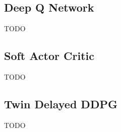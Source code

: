 \documentclass[../xlapes02]{subfiles}
\begin{document}
    \subsection{Deep Q Network}
    TODO

    \subsection{Soft Actor Critic}
    TODO

    \subsection{Twin Delayed DDPG}
    TODO


%
%
%
\end{document}
